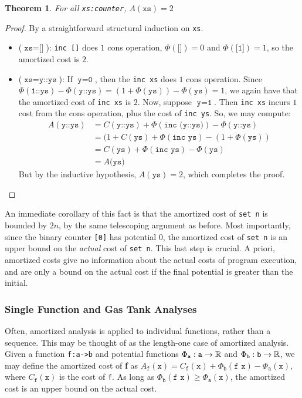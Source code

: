\documentclass[draft]{westhesis}
\newtheorem{theorem}{Theorem}[section]
\begin{document}
\begin{theorem}
For all \texttt{xs:counter}, $A(\texttt{xs}) = 2$
\end{theorem}
\label{thm:bc-phys}
\begin{proof}
By a straightforward structural induction on \texttt{xs}.
\begin{itemize}
  \item ($\texttt{xs} = \texttt{[]}$): \texttt{inc []} does $1$ cons operation, $\Phi(\texttt{[]}) = 0$ and $\Phi(\texttt{[1]}) = 1$, so the amortized cost is $2$.
  \item ($\texttt{xs} = \texttt{y::ys}$): If $\texttt{y} = \texttt{0}$, then the \texttt{inc xs} does $1$ cons operation. Since $\Phi(\texttt{1::ys}) - \Phi(\texttt{y::ys}) = (1 + \Phi(\texttt{ys})) - \Phi(\texttt{ys}) = 1$, we again have that the amortized cost of \texttt{inc xs} is $2$. Now, suppose $\texttt{y} = \texttt{1}$. Then \texttt{inc xs} incurs $1$ cost from the cons operation, plus the cost of \texttt{inc ys}. So, we may compute:
  \begin{align*}
    A(\texttt{y::ys}) &= C(\texttt{y::ys}) + \Phi(\texttt{inc (y::ys)}) - \Phi(\texttt{y::ys})\\
    &= (1 + C(\texttt{ys}) + \Phi(\texttt{inc ys}) - (1 + \Phi(\texttt{ys}))\\
    &= C(\texttt{ys}) + \Phi(\texttt{inc ys}) - \Phi(\texttt{ys})\\
    &= A(\texttt{ys)}
  \end{align*}
  But by the inductive hypothesis, $A(\texttt{ys}) = 2$, which completes the proof.
\end{itemize}
\end{proof}

An immediate corollary of this fact is that the amortized cost of \texttt{set n} is bounded by $2n$, by the same telescoping argument as before. Most importantly, since the binary counter \texttt{[0]} has potential $0$, the amortized cost of \texttt{set n} is an upper bound on the \textit{actual} cost of \texttt{set n}. This last step is crucial. A priori, amortized costs give no information about the actual costs of program execution, and are only a bound on the actual cost if the final potential is greater than the initial.

\subsubsection{Single Function and Gas Tank Analyses}
Often, amortized analysis is applied to individual functions, rather than a sequence. This may be thought of as the length-one case of amortized analysis.
Given a function \texttt{f:a->b} and potential functions $\Phi_\texttt{a} : \texttt{a} \to \mathbb{R}$ and $\Phi_\texttt{b} : \texttt{b} \to \mathbb{R}$, we may define
the amortized cost of \textbf{f} as $A_\texttt{f}(\texttt{x}) = C_\texttt{f}(\texttt{x}) + \Phi_\texttt{b}(\texttt{f x}) - \Phi_\texttt{a}(\texttt{x})$,
where $C_\texttt{f}(\texttt{x})$ is the cost of \texttt{f}. As long as $\Phi_\texttt{b}(\texttt{f x}) \geq \Phi_\texttt{a}(\texttt{x})$, the amortized cost is an upper bound on the actual cost.
\end{document}
